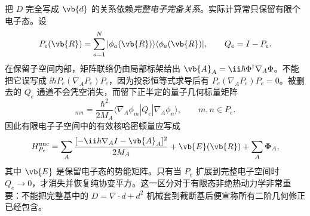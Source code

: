  把 \(D\) 完全写成 \(\vb{d}\) 的关系依赖\emph{完整电子完备关系}。实际计算常只保留有限个电子态。设
\[
P_e(\vb{R})=\sum_{a=1}^{N}|\phi_a(\vb{R})\rangle\langle\phi_a(\vb{R})|,
\qquad
Q_e=I-P_e.
\]
在保留子空间内部，矩阵联络仍由局部标架给出
\(\vb{A}_A=\ii\hbar\Phi^\dagger\nabla_A\Phi\)。不能把它误写成
\(\ii\hbar P_e(\nabla_AP_e)P_e\)，因为投影恒等式求导后有
\(P_e(\nabla_AP_e)P_e=0\)。被删去的 \(Q_e\) 通道不会凭空消失，而留下正半定的量子几何标量矩阵
\begin{equation}
[\boldsymbol\Phi_A]_{mn}
=\frac{\hbar^2}{2M_A}
\langle\nabla_A\phi_m|Q_e|\nabla_A\phi_n\rangle,
\qquad m,n\in P_e.
\label{eq:born-huang-finite-subspace-scalar}
\end{equation}
因此有限电子子空间中的有效核哈密顿量应写成
\begin{equation}
H_{P_e}^{\rm nuc}
=\sum_A\frac{[-\ii\hbar\nabla_A I-\vb{A}_A]^2}{2M_A}
+\vb{E}(\vb{R})+\sum_A\boldsymbol\Phi_A,
\label{eq:born-huang-finite-subspace-hamiltonian}
\end{equation}
其中 $\vb{E}$ 是保留电子态的势能矩阵。只有当 $P_e$ 扩展到完整电子空间时 $Q_e\to0$，才消失并恢复纯协变平方。这一区分对于有限态非绝热动力学非常重要：不能把完整基中的 $D=\nabla\!\cdot d+d^2$ 机械套到截断基后便宣称所有二阶几何修正已经包含。

